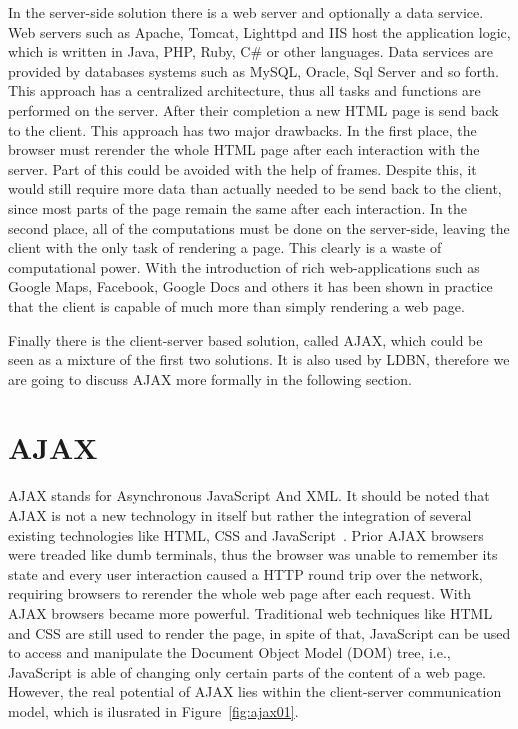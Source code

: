 In the server-side solution there is a web server and optionally a data service. 
Web servers such as Apache, Tomcat, Lighttpd and IIS host the application 
logic, which is written in Java, PHP, Ruby, C\# or other languages. 
Data services are provided by databases systems such as MySQL, Oracle, Sql Server and 
so forth. This approach has a centralized architecture, thus all tasks and 
functions are performed on the server. After their completion a new HTML page is 
send back to the client. This approach has two major drawbacks. In the first place, 
the browser must rerender the whole HTML page after each interaction with the server.
Part of this could be avoided with the help of frames. Despite this, it would still 
require more data than actually needed to be send back to the client, since most 
parts of the page remain the same after each interaction. In the second place, 
all of the computations must be done on the server-side, leaving the client with 
the only task of rendering a page. This clearly is a waste of computational power. 
With the introduction of rich web-applications such as Google Maps, Facebook, 
Google Docs and others it has been shown in practice that the client is capable of 
much more than simply rendering a web page. 

Finally there is the client-server based solution, called AJAX, which could be
seen as a mixture 
of the first two solutions. It is also used by LDBN, therefore we are going to
discuss AJAX more formally in the following section.

\section{AJAX}
\label{sec:ajax}
AJAX stands for Asynchronous JavaScript And XML. It should be noted
that AJAX is not a new technology in itself but rather the integration of several 
existing technologies like HTML, CSS and JavaScript~\cite{w3}. Prior AJAX browsers 
were treaded 
like dumb terminals, thus the browser was unable to remember its state and every 
user interaction caused a HTTP round trip over the network, requiring browsers 
to rerender the whole web page after each request. With AJAX browsers became 
more powerful. Traditional web techniques like HTML and CSS are still used to 
render the page, in spite of that, JavaScript can be used to access 
and manipulate the Document Object Model (DOM) tree, i.e., 
JavaScript is able of changing only certain parts
of the content of a web page. However, the
real potential of AJAX lies within the client-server communication model, which 
is ilusrated in Figure~\ref{fig:ajax01}.  

